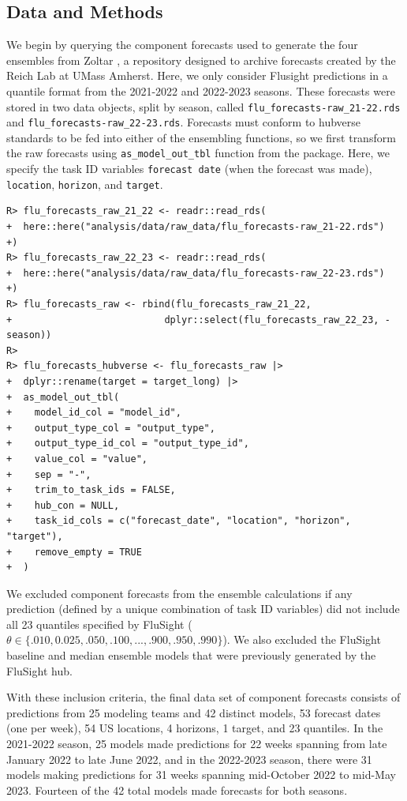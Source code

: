 \documentclass[
  article,
  shortnames,
  notitle]{jss}
\begin{document}
\subsection{Data and Methods}\label{data-and-methods}

We begin by querying the component forecasts used to generate the four
ensembles from Zoltar \citep{reich_zoltar_2021}, a repository designed
to archive forecasts created by the Reich Lab at UMass Amherst. Here, we
only consider Flusight predictions in a quantile format from the
2021-2022 and 2022-2023 seasons. These forecasts were stored in two data
objects, split by season, called \texttt{flu\_forecasts-raw\_21-22.rds}
and \texttt{flu\_forecasts-raw\_22-23.rds}. Forecasts must conform to
hubverse standards to be fed into either of the ensembling functions, so
we first transform the raw forecasts using \texttt{as\_model\_out\_tbl}
function from the  package. Here, we specify the task ID
variables \texttt{forecast\ date} (when the forecast was made),
\texttt{location}, \texttt{horizon}, and \texttt{target}.

\begin{verbatim}
R> flu_forecasts_raw_21_22 <- readr::read_rds(
+  here::here("analysis/data/raw_data/flu_forecasts-raw_21-22.rds")
+)
R> flu_forecasts_raw_22_23 <- readr::read_rds(
+  here::here("analysis/data/raw_data/flu_forecasts-raw_22-23.rds")
+)
R> flu_forecasts_raw <- rbind(flu_forecasts_raw_21_22,
+                           dplyr::select(flu_forecasts_raw_22_23, -season))
R> 
R> flu_forecasts_hubverse <- flu_forecasts_raw |>
+  dplyr::rename(target = target_long) |>
+  as_model_out_tbl(
+    model_id_col = "model_id",
+    output_type_col = "output_type",
+    output_type_id_col = "output_type_id",
+    value_col = "value",
+    sep = "-",
+    trim_to_task_ids = FALSE,
+    hub_con = NULL,
+    task_id_cols = c("forecast_date", "location", "horizon", "target"),
+    remove_empty = TRUE
+  )
\end{verbatim}

We excluded component forecasts from the ensemble calculations if any
prediction (defined by a unique combination of task ID variables) did
not include all 23 quantiles specified by FluSight
(\(\theta \in \{.010, 0.025, .050, .100, ..., .900, .950, .990\}\)). We
also excluded the FluSight baseline and median ensemble models that were
previously generated by the FluSight hub.

With these inclusion criteria, the final data set of component forecasts
consists of predictions from 25 modeling teams and 42 distinct models,
53 forecast dates (one per week), 54 US locations, 4 horizons, 1 target,
and 23 quantiles. In the 2021-2022 season, 25 models made predictions
for 22 weeks spanning from late January 2022 to late June 2022, and in
the 2022-2023 season, there were 31 models making predictions for 31
weeks spanning mid-October 2022 to mid-May 2023. Fourteen of the 42
total models made forecasts for both seasons.
\end{document}
